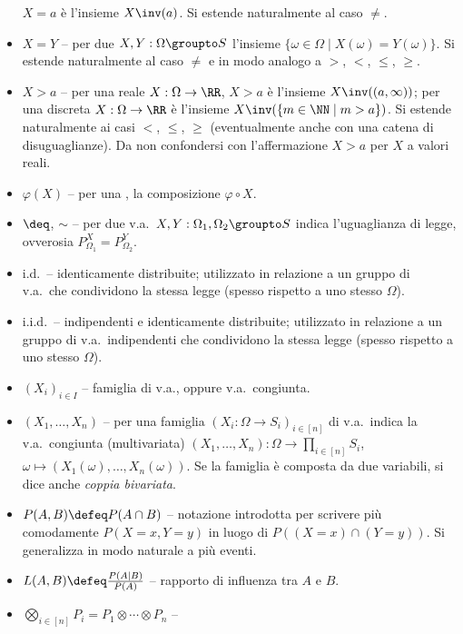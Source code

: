 \begin{multicols*}{2}
\begin{itemize}
        $X = a$ è l'insieme $X\inv(a)$. Si estende naturalmente
        al caso $\neq$.
        \item $X = Y$ -- per due \va $X, Y : \Omega \groupto S$
        l'insieme $\{ \omega \in \Omega \mid X(\omega) = Y(\omega) \}$.
        Si estende naturalmente al caso $\neq$ e in modo analogo a $>$, $<$, $\leq$, $\geq$.
        \item $X > a$ -- per una \va reale $X : \Omega \to \RR$,
        $X > a$ è l'insieme $X\inv((a, \infty))$; per una \va discreta
        $X : \Omega \to \RR$ è l'insieme $X\inv(\{m \in \NN \mid m > a\})$.
        Si estende naturalmente ai casi $<$, $\leq$, $\geq$ (eventualmente
        anche con una catena di disuguaglianze). Da non confondersi con
        l'affermazione $X > a$ per $X$ a valori reali.
        \item $\varphi(X)$ -- per una \va, la composizione $\varphi \circ X$.
        \item $\deq$, $\sim$ -- per due v.a.~$X, Y : \Omega_1, \Omega_2 \groupto S$
        indica l'uguaglianza di legge, ovverosia $P_{\Omega_1}^X = P_{\Omega_2}^Y$.
        \item i.d.~-- identicamente distribuite; utilizzato in relazione a un gruppo
        di v.a.~che condividono la stessa legge (spesso rispetto a uno stesso $\Omega$).
        \item i.i.d.~-- indipendenti e identicamente distribuite; utilizzato in relazione
        a un gruppo di v.a.~indipendenti che condividono la stessa legge (spesso rispetto
        a uno stesso $\Omega$).
        \item $(X_i)_{i \in I}$ -- famiglia di v.a., oppure v.a.~congiunta.
        \item $(X_1, \ldots, X_n)$ -- per una famiglia $(X_i : \Omega \to S_i)_{i \in [n]}$ di
        v.a.~indica la v.a.~congiunta (multivariata) $(X_1, \ldots, X_n) : \Omega \to \prod_{i \in [n]} S_i$, $\omega \mapsto (X_1(\omega), \ldots, X_n(\omega))$. Se la
        famiglia è composta da due variabili, si dice anche \textit{coppia bivariata}.
        \item $P(A, B) \defeq P(A \cap B)$ -- notazione introdotta per scrivere
        più comodamente $P(X = x, Y = y)$ in luogo di $P((X = x) \cap (Y = y))$. Si
        generalizza in modo naturale a più eventi.
        \item $L(A, B) \defeq \frac{P(A \mid B)}{P(A)}$ -- rapporto di influenza tra
        $A$ e $B$.
        \item $\bigotimes_{i \in [n]} P_i = P_1 \otimes \cdots \otimes P_n$ --

\end{itemize}
\end{multicols*}

